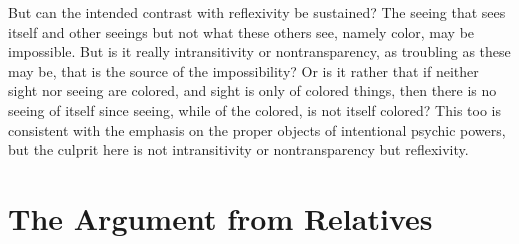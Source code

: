 But can the intended contrast with reflexivity be sustained? The seeing that sees itself and other seeings but not what these others see, namely color, may be impossible. But is it really intransitivity or nontransparency, as troubling as these may be, that is the source of the impossibility? Or is it rather that if neither sight nor seeing are colored, and sight is only of colored things, then there is no seeing of itself since seeing, while of the colored, is not itself colored? This too is consistent with the emphasis on the proper objects of intentional psychic powers, but the culprit here is not intransitivity or nontransparency but reflexivity.









\section{The Argument from Relatives} %
\label{sec:the_argument_from_relatives}

